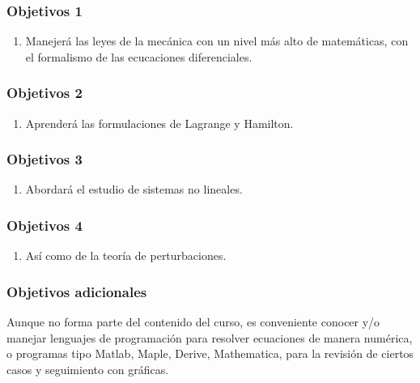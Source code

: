 \documentclass[12pt]{beamer}
\begin{document}
\begin{frame}
\frametitle{Objetivos 1}
\begin{enumerate}[<+->]
\item Manejerá las leyes de la mecánica con un nivel más alto de matemáticas, con el formalismo de las ecucaciones diferenciales.
\seti
\end{enumerate}
\end{frame}
\begin{frame}
\frametitle{Objetivos 2}
\begin{enumerate}[<+->]
\conti
\item Aprenderá las formulaciones de Lagrange y Hamilton.
\seti
\end{enumerate}
\end{frame}
\begin{frame}
\frametitle{Objetivos 3}
\begin{enumerate}[<+->]
\conti
\item Abordará el estudio de sistemas no lineales.
\seti
\end{enumerate}
\end{frame}
\begin{frame}
\frametitle{Objetivos 4}
\begin{enumerate}[<+->]
\conti
\item Así como de la teoría de perturbaciones.
\end{enumerate}
\end{frame}
\begin{frame}
\frametitle{Objetivos adicionales}
Aunque no forma parte del contenido del curso, es conveniente conocer y/o manejar lenguajes de programación para resolver ecuaciones de manera numérica, o programas tipo Matlab, Maple, Derive, Mathematica, para la revisión de ciertos casos y seguimiento con gráficas.
\end{frame}
\end{document}
